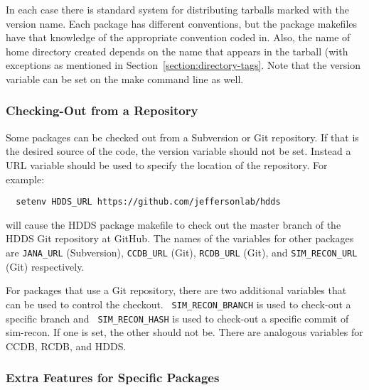 \documentclass[12pt]{article}
\begin{document}
In each case there is standard system for distributing tarballs marked
with the version name. Each package has different conventions, but the
package makefiles have that knowledge of the appropriate convention
coded in. Also, the name of home directory created depends on the name
that appears in the tarball (with exceptions as mentioned in
Section~\ref{section:directory-tags}. Note that the version variable
can be set on the make command line as well.

\subsubsection{Checking-Out from a Repository}

Some packages can be checked out from a Subversion or Git
repository. If that is the desired source of the code, the version
variable should not be set. Instead a URL variable should be used to
specify the location of the repository. For example:

\begin{verbatim}
  setenv HDDS_URL https://github.com/jeffersonlab/hdds
\end{verbatim}

will cause the HDDS package makefile to check out the master branch of
the HDDS Git repository at GitHub. The names of the variables for
other packages are {\tt JANA\_URL} (Subversion), {\tt CCDB\_URL}
(Git), {\tt RCDB\_URL} (Git), and {\tt SIM\_RECON\_URL} (Git)
respectively.

For packages that use a Git repository, there are two additional
variables that can be used to control the checkout. {\tt
  SIM\_RECON\_BRANCH} is used to check-out a specific branch and {\tt
  SIM\_RECON\_HASH} is used to check-out a specific commit of
sim-recon. If one is set, the other should not be. There are analogous
variables for CCDB, RCDB, and HDDS.

\subsubsection{Extra Features for Specific Packages}\label{section:makefile-extras}
\end{document}
